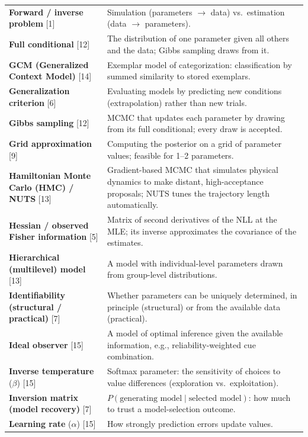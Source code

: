 \begin{longtable}[]{@{}
  >{\raggedright\arraybackslash}p{}
  >{\raggedright\arraybackslash}p{}@{}}
\textbf{Forward / inverse problem} {[}1{]} & Simulation (parameters \ensuremath{\rightarrow}
data) vs.~estimation (data \ensuremath{\rightarrow} parameters). \\
\textbf{Full conditional} {[}12{]} & The distribution of one parameter
given all others and the data; Gibbs sampling draws from it. \\
\textbf{GCM (Generalized Context Model)} {[}14{]} & Exemplar model of
categorization: classification by summed similarity to stored
exemplars. \\
\textbf{Generalization criterion} {[}6{]} & Evaluating models by
predicting new conditions (extrapolation) rather than new trials. \\
\textbf{Gibbs sampling} {[}12{]} & MCMC that updates each parameter by
drawing from its full conditional; every draw is accepted. \\
\textbf{Grid approximation} {[}9{]} & Computing the posterior on a grid
of parameter values; feasible for 1--2 parameters. \\
\textbf{Hamiltonian Monte Carlo (HMC) / NUTS} {[}13{]} & Gradient-based
MCMC that simulates physical dynamics to make distant, high-acceptance
proposals; NUTS tunes the trajectory length automatically. \\
\textbf{Hessian / observed Fisher information} {[}5{]} & Matrix of
second derivatives of the NLL at the MLE; its inverse approximates the
covariance of the estimates. \\
\textbf{Hierarchical (multilevel) model} {[}13{]} & A model with
individual-level parameters drawn from group-level distributions. \\
\textbf{Identifiability (structural / practical)} {[}7{]} & Whether
parameters can be uniquely determined, in principle (structural) or from
the available data (practical). \\
\textbf{Ideal observer} {[}15{]} & A model of optimal inference given
the available information, e.g., reliability-weighted cue
combination. \\
\textbf{Inverse temperature} (\(\beta\)) {[}15{]} & Softmax parameter:
the sensitivity of choices to value differences (exploration
vs.~exploitation). \\
\textbf{Inversion matrix (model recovery)} {[}7{]} &
\(P(\text{generating model} \mid \text{selected model})\): how much to
trust a model-selection outcome. \\
\textbf{Learning rate} (\(\alpha\)) {[}15{]} & How strongly prediction
errors update values. \\

\end{longtable}
